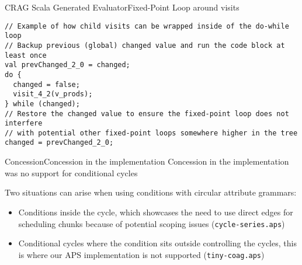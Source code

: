 
\begin{frame}[fragile=singleslide]{CRAG Scala Generated Evaluator}{Fixed-Point Loop around visits}
\begin{Verbatim}[fontsize=\scriptsize]
// Example of how child visits can be wrapped inside of the do-while loop
// Backup previous (global) changed value and run the code block at least once
val prevChanged_2_0 = changed;
do {
  changed = false;
  visit_4_2(v_prods);
} while (changed);
// Restore the changed value to ensure the fixed-point loop does not interfere
// with potential other fixed-point loops somewhere higher in the tree
changed = prevChanged_2_0;
\end{Verbatim}
\end{frame}


\begin{frame}{Concession}{Concession in the implementation}
    \alert{Concession} in the implementation was \alert{no support for conditional cycles}

    \newlinevspace 
    Two situations can arise when using conditions with circular attribute grammars:
    
    \begin{itemize}
        \item[] \cmark \; \alert{Conditions inside the cycle}, which showcases the need to use direct edges for scheduling chunks because of potential scoping issues (\texttt{cycle-series.aps})
        \item[] \xmark \; Conditional cycles where the \alert{condition sits outside controlling the cycles}, this is where our APS implementation is not supported (\texttt{tiny-coag.aps})
    \end{itemize}
\end{frame}

